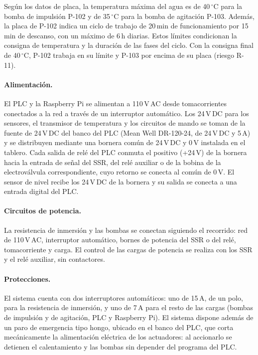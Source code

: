 Según los datos de placa, la temperatura máxima del agua es de 40\,$^{\circ}$C para la bomba de impulsión P-102 y de 35\,$^{\circ}$C para la bomba de agitación P-103. Además, la placa de P-102 indica un ciclo de trabajo de 20\,min de funcionamiento por 15\,min de descanso, con un máximo de 6\,h diarias. Estos límites condicionan la consigna de temperatura y la duración de las fases del ciclo. Con la consigna final de 40\,$^{\circ}$C, P-102 trabaja en su límite y P-103 por encima de su placa (riesgo R-11).

\paragraph{Alimentación.} El PLC y la Raspberry Pi se alimentan a 110\,V\,AC desde tomacorrientes conectados a la red a través de un interruptor automático. Los 24\,V\,DC para los sensores, el transmisor de temperatura y los circuitos de mando se toman de la fuente de 24\,V\,DC del banco del PLC (Mean Well DR-120-24, de 24\,V\,DC y 5\,A) y se distribuyen mediante una bornera común de 24\,V\,DC y 0\,V instalada en el tablero. Cada salida de relé del PLC conmuta el positivo (+24\,V) de la bornera hacia la entrada de señal del SSR, del relé auxiliar o de la bobina de la electroválvula correspondiente, cuyo retorno se conecta al común de 0\,V. El sensor de nivel recibe los 24\,V\,DC de la bornera y su salida se conecta a una entrada digital del PLC.

\paragraph{Circuitos de potencia.} La resistencia de inmersión y las bombas se conectan siguiendo el recorrido: red de 110\,V\,AC, interruptor automático, bornes de potencia del SSR o del relé, tomacorriente y carga. El control de las cargas de potencia se realiza con los SSR y el relé auxiliar, sin contactores.

\paragraph{Protecciones.} El sistema cuenta con dos interruptores automáticos: uno de 15\,A, de un polo, para la resistencia de inmersión, y uno de 7\,A para el resto de las cargas (bombas de impulsión y de agitación, PLC y Raspberry Pi). El sistema dispone además de un paro de emergencia tipo hongo, ubicado en el banco del PLC, que corta mecánicamente la alimentación eléctrica de los actuadores: al accionarlo se detienen el calentamiento y las bombas sin depender del programa del PLC.

